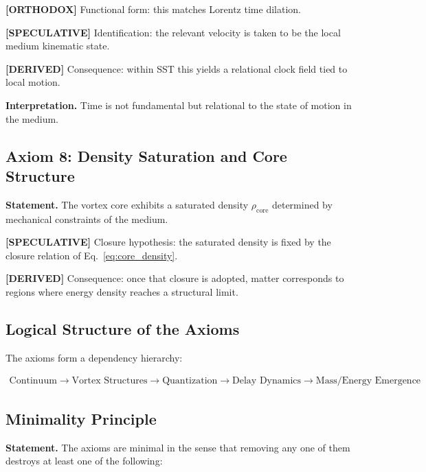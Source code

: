 \documentclass[11pt]{article}
\theoremstyle{definition}
\theoremstyle{plain}
\theoremstyle{remark}
\newcommand{\rhocore}{\rho_{\mathrm{core}}}
\begin{document}
        \textbf{[ORTHODOX]} Functional form: this matches Lorentz time dilation.

        \textbf{[SPECULATIVE]} Identification: the relevant velocity is taken to be the local medium kinematic state.

        \textbf{[DERIVED]} Consequence: within SST this yields a relational clock field tied to local motion.
        
        \textbf{Interpretation.}
        Time is not fundamental but relational to the state of motion in the medium.
    
    \subsection{Axiom 8: Density Saturation and Core Structure}
        
        \textbf{Statement.}
        The vortex core exhibits a saturated density $\rhocore$ determined by mechanical constraints of the medium.
        
        \textbf{[SPECULATIVE]} Closure hypothesis: the saturated density is fixed by the closure relation of Eq.~\eqref{eq:core_density}.

        \textbf{[DERIVED]} Consequence: once that closure is adopted, matter corresponds to regions where energy density reaches a structural limit.
    
    \subsection{Logical Structure of the Axioms}
        
        The axioms form a dependency hierarchy:
        
        \begin{align}
            \text{Continuum}
            \rightarrow \text{Vortex Structures}
            \rightarrow \text{Quantization}
            \rightarrow \text{Delay Dynamics}
            \rightarrow \text{Mass/Energy Emergence}
        \end{align}
    
    \subsection{Minimality Principle}
        
        \textbf{Statement.}
        The axioms are minimal in the sense that removing any one of them destroys at least one of the following:
        
\end{document}
